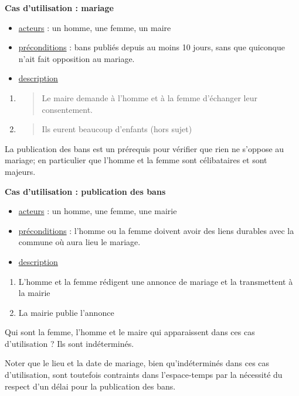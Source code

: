\documentclass[a4paper, 12pt, openright, french]{book}
\begin{document}
\textbf{Cas d'utilisation : mariage}

\begin{itemize}
\item
  \uline{acteurs} : un homme, une femme, un maire
\item
  \uline{préconditions} : bans publiés depuis au moins 10 jours, sans
  que quiconque n'ait fait opposition au mariage.
\item
  \uline{description}
\end{itemize}

\begin{enumerate}
\def\labelenumi{\arabic{enumi}.}
\item
  \begin{quote}
  Le maire demande à l'homme et à la femme
  d'échanger leur consentement.
  \end{quote}
\item
  \begin{quote}
  Ils eurent beaucoup d'enfants (hors sujet)
  \end{quote}
\end{enumerate}

La publication des bans est un prérequis pour vérifier que rien ne
s'oppose au mariage; en particulier que
l'homme et la femme sont célibataires et sont majeurs.

\textbf{Cas d'utilisation : publication des bans}

\begin{itemize}
\item
  \uline{acteurs} : un homme, une femme, une mairie
\item
  \uline{préconditions} : l'homme ou la femme doivent
  avoir des liens durables avec la commune où aura lieu le mariage.
\item
  \uline{description}
\end{itemize}

\begin{enumerate}
\def\labelenumi{\arabic{enumi}.}
\item
  L'homme et la femme rédigent une annonce de mariage et
  la transmettent à la mairie
\item
  La mairie publie l'annonce
\end{enumerate}

Qui sont la femme, l'homme et le maire qui apparaissent
dans ces cas d'utilisation ? Ils sont indéterminés.

Noter que le lieu et la date de mariage, bien
qu'indéterminés dans ces cas
d'utilisation, sont toutefois contraints dans
l'espace-temps par la nécessité du respect
d'un délai pour la publication des bans.
\end{document}
